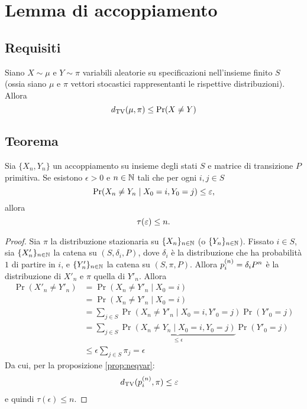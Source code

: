 \section{Lemma di accoppiamento}


\subsection{Requisiti}
\begin{prop}\label{prop:neqvar}
	Siano $X\sim\mu$ e $Y\sim\pi$ variabili aleatorie su specificazioni nell'insieme finito $S$ (ossia siano $\mu$ e $\pi$ vettori stocastici rappresentanti le rispettive distribuzioni). Allora
	\begin{equation*}
		\dtv(\mu,\pi)\le\Pr(X\ne Y)
	\end{equation*}
\end{prop}


\subsection{Teorema}
\begin{lemma}[di accoppiamento]
	Sia $\{X_n,Y_n\}$ un accoppiamento su insieme degli stati $S$ e matrice di transizione $P$ primitiva. Se esistono $\epsilon>0$ e $n\in\N$ tali che per ogni $i,j\in S$
	\begin{equation*}
		\Pr(X_n\ne Y_n\mid X_0=i,Y_0=j) \le \epsilon \text,
	\end{equation*}
	allora
	\begin{equation*}
		\tau(\epsilon) \le n \text.
	\end{equation*}
\end{lemma}
\begin{proof}
	Sia $\pi$ la distribuzione stazionaria su $\chain X$ (o $\chain Y$).
	Fissato $i\in S$, sia $\chain{X'}$ la catena su $(S,\delta_i,P)$, dove $\delta_i$ è la distribuzione che ha probabilità $1$ di partire in $i$, e $\chain{Y'}$ la catena su $(S,\pi,P)$. Allora $p\ape{n}_i=\delta_i P^n$ è la distribuzione di $X'_n$ e $\pi$ quella di $Y'_n$.
	Allora
	\begin{align*}
		\Pr(X'_n\ne Y'_n) & = \Pr(X_n\ne Y'_n\mid X_0=i)                                                          \\
		                  & = \Pr(X_n\ne Y'_n\mid X_0=i)                                                          \\
		                  & = \sum_{j\in S} \Pr(X_n\ne Y'_n\mid X_0=i,Y'_0=j)\Pr(Y'_0=j)                          \\
		                  & = \sum_{j\in S} \underbrace{\Pr(X_n\ne Y_n\mid X_0=i,Y_0=j)}_{\le\epsilon}\Pr(Y'_0=j) \\
		                  & \le \epsilon \sum_{j\in S} \pi_j = \epsilon
	\end{align*}
	Da cui, per la proposizione \ref{prop:neqvar}:
	\begin{align*}
		\dtv(p\ape{n}_i,\pi) & \le \epsilon
	\end{align*}
	e quindi $\tau(\epsilon)\le n$.
\end{proof}
